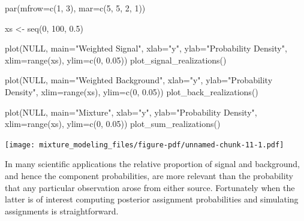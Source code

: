 \documentclass[
  letterpaper,
  DIV=11,
  numbers=noendperiod]{scrartcl}
\newenvironment{Shaded}{\begin{snugshade}}{\end{snugshade}}
\newcommand{\AttributeTok}[1]{\textcolor[rgb]{0.40,0.45,0.13}{#1}}
\newcommand{\ConstantTok}[1]{\textcolor[rgb]{0.56,0.35,0.01}{#1}}
\newcommand{\DecValTok}[1]{\textcolor[rgb]{0.68,0.00,0.00}{#1}}
\newcommand{\FloatTok}[1]{\textcolor[rgb]{0.68,0.00,0.00}{#1}}
\newcommand{\FunctionTok}[1]{\textcolor[rgb]{0.28,0.35,0.67}{#1}}
\newcommand{\NormalTok}[1]{\textcolor[rgb]{0.00,0.23,0.31}{#1}}
\newcommand{\OtherTok}[1]{\textcolor[rgb]{0.00,0.23,0.31}{#1}}
\newcommand{\StringTok}[1]{\textcolor[rgb]{0.13,0.47,0.30}{#1}}
\begin{document}
\begin{Shaded}
\begin{Highlighting}[]
\FunctionTok{par}\NormalTok{(}\AttributeTok{mfrow=}\FunctionTok{c}\NormalTok{(}\DecValTok{1}\NormalTok{, }\DecValTok{3}\NormalTok{), }\AttributeTok{mar=}\FunctionTok{c}\NormalTok{(}\DecValTok{5}\NormalTok{, }\DecValTok{5}\NormalTok{, }\DecValTok{2}\NormalTok{, }\DecValTok{1}\NormalTok{))}

\NormalTok{xs }\OtherTok{\textless{}{-}} \FunctionTok{seq}\NormalTok{(}\DecValTok{0}\NormalTok{, }\DecValTok{100}\NormalTok{, }\FloatTok{0.5}\NormalTok{)}

\FunctionTok{plot}\NormalTok{(}\ConstantTok{NULL}\NormalTok{, }\AttributeTok{main=}\StringTok{"Weighted Signal"}\NormalTok{,}
     \AttributeTok{xlab=}\StringTok{"y"}\NormalTok{, }\AttributeTok{ylab=}\StringTok{"Probability Density"}\NormalTok{,}
     \AttributeTok{xlim=}\FunctionTok{range}\NormalTok{(xs), }\AttributeTok{ylim=}\FunctionTok{c}\NormalTok{(}\DecValTok{0}\NormalTok{, }\FloatTok{0.05}\NormalTok{))}
\FunctionTok{plot\_signal\_realizations}\NormalTok{()}

\FunctionTok{plot}\NormalTok{(}\ConstantTok{NULL}\NormalTok{, }\AttributeTok{main=}\StringTok{"Weighted Background"}\NormalTok{,}
     \AttributeTok{xlab=}\StringTok{"y"}\NormalTok{, }\AttributeTok{ylab=}\StringTok{"Probability Density"}\NormalTok{,}
     \AttributeTok{xlim=}\FunctionTok{range}\NormalTok{(xs), }\AttributeTok{ylim=}\FunctionTok{c}\NormalTok{(}\DecValTok{0}\NormalTok{, }\FloatTok{0.05}\NormalTok{))}
\FunctionTok{plot\_back\_realizations}\NormalTok{()}

\FunctionTok{plot}\NormalTok{(}\ConstantTok{NULL}\NormalTok{, }\AttributeTok{main=}\StringTok{"Mixture"}\NormalTok{,}
     \AttributeTok{xlab=}\StringTok{"y"}\NormalTok{, }\AttributeTok{ylab=}\StringTok{"Probability Density"}\NormalTok{,}
     \AttributeTok{xlim=}\FunctionTok{range}\NormalTok{(xs), }\AttributeTok{ylim=}\FunctionTok{c}\NormalTok{(}\DecValTok{0}\NormalTok{, }\FloatTok{0.05}\NormalTok{))}
\FunctionTok{plot\_sum\_realizations}\NormalTok{()}
\end{Highlighting}
\end{Shaded}

\texttt{[image: mixture\_modeling\_files/figure-pdf/unnamed-chunk-11-1.pdf]}

In many scientific applications the relative proportion of signal and
background, and hence the component probabilities, are more relevant
than the probability that any particular observation arose from either
source. Fortunately when the latter is of interest computing posterior
assignment probabilities and simulating assignments is straightforward.
\end{document}
